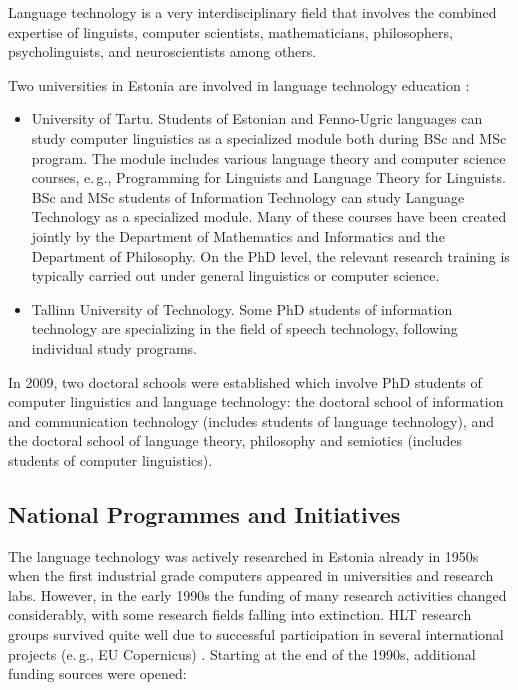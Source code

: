 \begin{multicols}{2}
Language technology is a very interdisciplinary field that involves the combined expertise of linguists, computer scientists, mathematicians, philosophers, psycholinguists, and neuroscientists among others.

Two universities in Estonia are involved in language technology education \cite{Meisteretal}: 

\begin{itemize}
\item University of Tartu. Students of Estonian and Fenno-Ugric languages can study computer linguistics as a specialized module both during BSc and MSc program. The module includes various language theory and computer science courses, e.\,g., Programming for Linguists and Language Theory for Linguists. BSc and MSc students of Information Technology can study Language Technology as a specialized module. Many of these courses have been created jointly by the Department of Mathematics and Informatics and the Department of Philosophy. On the PhD level, the relevant research training is typically carried out under general linguistics or computer science.  
\item Tallinn University of Technology. Some PhD students of information technology are specializing in the field of speech technology, following individual study programs.  
\end{itemize}

In 2009, two doctoral schools were established which involve PhD students of computer linguistics and language technology: the doctoral school of information and communication technology (includes students of language technology), and the doctoral school of language theory, philosophy and semiotics (includes students of computer linguistics).

\subsection{National Programmes and Initiatives}

The language technology was actively researched in Estonia already in 1950s when the first industrial grade computers appeared in universities and research labs.  However, in the early 1990s the funding of many research activities changed considerably, with some research fields falling into extinction.  HLT research groups survived quite well due to successful participation in several international projects (e.\,g., EU Copernicus) \cite{Meisteretal}.  Starting at the end of the 1990s, additional funding sources were opened:


\end{multicols}
